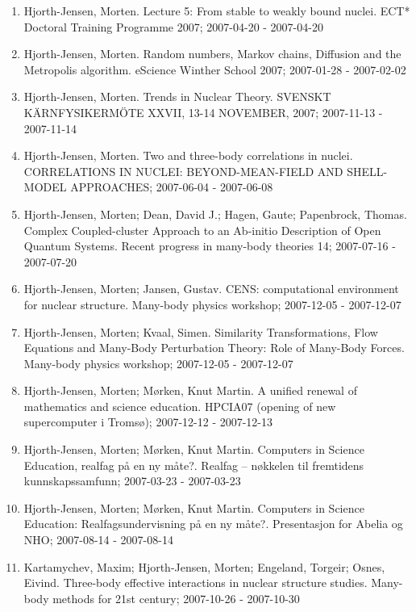 \documentclass[a4wide,10pt]{article}
\begin{document}
\begin{enumerate}
\item Hjorth-Jensen, Morten.  Lecture 5: From stable to weakly bound nuclei. ECT* Doctoral Training Programme 2007; 2007-04-20 - 2007-04-20

\item Hjorth-Jensen, Morten.  Random numbers, Markov chains, Diffusion and the Metropolis algorithm. eScience Winther School 2007; 2007-01-28 - 2007-02-02

\item Hjorth-Jensen, Morten.  Trends in Nuclear Theory. SVENSKT KÄRNFYSIKERMÖTE XXVII, 13-14 NOVEMBER, 2007; 2007-11-13 - 2007-11-14

\item Hjorth-Jensen, Morten.  Two and three-body correlations in nuclei. CORRELATIONS IN NUCLEI: BEYOND-MEAN-FIELD AND SHELL-MODEL APPROACHES; 2007-06-04 - 2007-06-08

\item Hjorth-Jensen, Morten; Dean, David J.; Hagen, Gaute; Papenbrock, Thomas.  Complex Coupled-cluster Approach to an Ab-initio Description of Open Quantum Systems. Recent progress in many-body theories 14; 2007-07-16 - 2007-07-20

\item Hjorth-Jensen, Morten; Jansen, Gustav.  CENS: computational environment for nuclear structure. Many-body physics workshop; 2007-12-05 - 2007-12-07

\item Hjorth-Jensen, Morten; Kvaal, Simen. Similarity Transformations, Flow Equations and Many-Body Perturbation Theory: Role of Many-Body Forces. Many-body physics workshop; 2007-12-05 - 2007-12-07

\item Hjorth-Jensen, Morten; Mørken, Knut Martin.  A uniﬁed renewal of mathematics and science education. HPCIA07 (opening of new supercomputer i Tromsø); 2007-12-12 - 2007-12-13

\item Hjorth-Jensen, Morten; Mørken, Knut Martin. Computers in Science Education, realfag på en ny måte?. Realfag – nøkkelen til fremtidens kunnskapssamfunn; 2007-03-23 - 2007-03-23

\item Hjorth-Jensen, Morten; Mørken, Knut Martin.  Computers in Science Education: Realfagsundervisning på en ny måte?. Presentasjon for Abelia og NHO; 2007-08-14 - 2007-08-14

\item Kartamychev, Maxim; Hjorth-Jensen, Morten; Engeland, Torgeir; Osnes, Eivind.  Three-body effective interactions in nuclear structure studies. Many-body methods for 21st century; 2007-10-26 - 2007-10-30


\end{enumerate}
\end{document}
